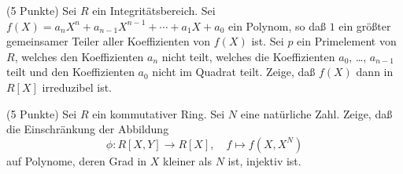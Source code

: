 \documentclass{algsheet}
\begin{document}
\begin{exercise}(5 Punkte)\newline
    Sei \(R\) ein Integritätsbereich. Sei \(f(X) = a_n X^n + a_{n - 1} X^{n - 1}
    + \dotsb + a_1 X + a_0\) ein Polynom, so daß \(1\) ein größter gemeinsamer
    Teiler aller Koeffizienten von \(f(X)\) ist. Sei \(p\) ein Primelement
    von \(R\), welches den Koeffizienten \(a_n\) nicht teilt, welches die
    Koeffizienten \(a_0\), \dots, \(a_{n - 1}\) teilt und den Koeffizienten
    \(a_0\) nicht im Quadrat teilt. Zeige, daß \(f(X)\) dann in \(R[X]\)
    irreduzibel ist.
\end{exercise}

\begin{exercise}(5 Punkte)\newline
    Sei \(R\) ein kommutativer Ring. Sei \(N\) eine natürliche Zahl. Zeige,
    daß die Einschränkung der Abbildung
    \begin{equation}  
        \phi\colon R[X, Y] \to R[X],\quad f \mapsto f(X, X^N)
    \end{equation}
    auf Polynome, deren Grad in \(X\) kleiner als \(N\) ist, injektiv ist.
\end{exercise}
\end{document}
